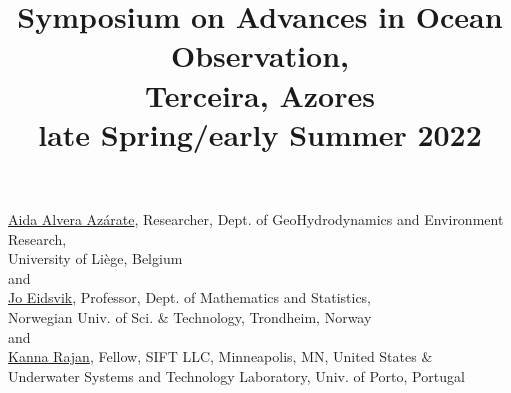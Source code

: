 \documentclass[10pt,letterpaper]{article}
\title{Symposium on Advances in Ocean Observation,\\
  Terceira, Azores \\ \large{\textbf{late Spring/early Summer 2022}}}
\date{}
\begin{document}
\maketitle{}

\vspace{-1.75cm}
\begin{center}
  \href{http://modb.oce.ulg.ac.be/mediawiki/index.php/User:Aida}{\textsf{Aida Alvera Az\'{a}rate}},
  Researcher, Dept. of GeoHydrodynamics and Environment Research,\\
  University of Li\`{e}ge, Belgium\\
  and\\
  \href{https://www.ntnu.edu/employees/jo.eidsvik}{\textsf{Jo Eidsvik}},
  Professor, Dept. of Mathematics and Statistics, \\Norwegian Univ. of
  Sci. \& Technology, Trondheim, Norway\\
  and\\
  \href{https://kanna.rajan.systems}{\textsf{Kanna Rajan}},
  Fellow, SIFT LLC, Minneapolis, MN, United States \& \\Underwater Systems and Technology
  Laboratory, Univ. of Porto, Portugal
\end{center}





\newpage


\renewcommand{\thepage}{}
\end{document}
